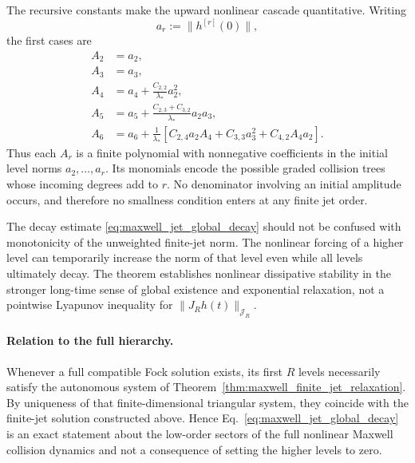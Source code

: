 \documentclass[11pt,oneside]{article}
\numberwithin{equation}{section}
\theoremstyle{definition}
\begin{document}
The recursive constants make the upward nonlinear cascade quantitative.
Writing
\begin{equation}
a_r:=\|h^{[r]}(0)\|,
\end{equation}
the first cases are
\begin{align}
A_2&=a_2,
\\
A_3&=a_3,
\\
A_4
&=
a_4
+
\frac{C_{2,2}}{\lambda_*}a_2^2,
\label{eq:maxwell_jet_A4}
\\
A_5
&=
a_5
+
\frac{C_{2,3}+C_{3,2}}{\lambda_*}
a_2a_3,
\label{eq:maxwell_jet_A5}
\\
A_6
&=
a_6
+
\frac{1}{\lambda_*}
\left[
C_{2,4}a_2A_4
+
C_{3,3}a_3^2
+
C_{4,2}A_4a_2
\right].
\label{eq:maxwell_jet_A6}
\end{align}
Thus each $A_r$ is a finite polynomial with nonnegative coefficients in
the initial level norms $a_2,\ldots,a_r$.  Its monomials encode the
possible graded collision trees whose incoming degrees add to $r$.
No denominator involving an initial amplitude occurs, and therefore no
smallness condition enters at any finite jet order.

The decay estimate
\eqref{eq:maxwell_jet_global_decay} should not be confused with
monotonicity of the unweighted finite-jet norm.  The nonlinear forcing of a
higher level can temporarily increase the norm of that level even while
all levels ultimately decay.  The theorem establishes nonlinear
dissipative stability in the stronger long-time sense of global existence
and exponential relaxation, not a pointwise Lyapunov inequality for
$\|J_Rh(t)\|_{\mathscr J_R}$.

\paragraph{Relation to the full hierarchy.}

Whenever a full compatible Fock solution exists, its first $R$ levels
necessarily satisfy the autonomous system of
Theorem~\ref{thm:maxwell_finite_jet_relaxation}.  By uniqueness of that
finite-dimensional triangular system, they coincide with the finite-jet
solution constructed above.  Hence
Eq.~\eqref{eq:maxwell_jet_global_decay} is an exact statement about the
low-order sectors of the full nonlinear Maxwell collision dynamics and
not a consequence of setting the higher levels to zero.
\end{document}
